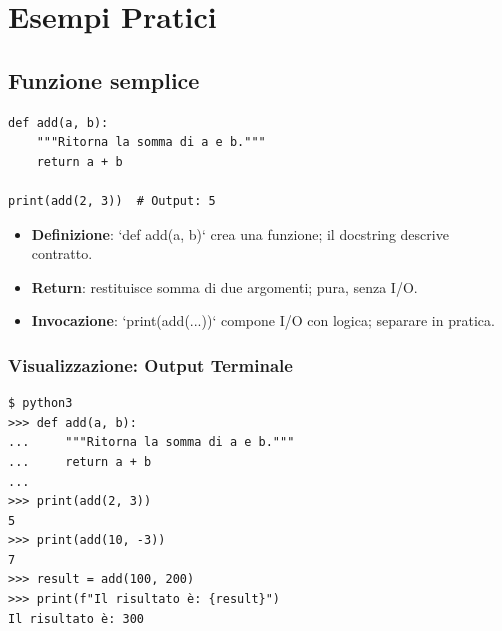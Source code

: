 \section{Esempi Pratici}
\label{sec:fun-esempi}
\subsection{Funzione semplice}
\label{subsec:fun-semplice}
\begin{lstlisting}
def add(a, b):
    """Ritorna la somma di a e b."""
    return a + b

print(add(2, 3))  # Output: 5
\end{lstlisting}
\begin{tcolorbox}[title=Spiegazione del codice]
\begin{itemize}
  \item \textbf{Definizione}: `def add(a, b)` crea una funzione; il docstring descrive contratto.
  \item \textbf{Return}: restituisce somma di due argomenti; pura, senza I/O.
  \item \textbf{Invocazione}: `print(add(...))` compone I/O con logica; separare in pratica.
\end{itemize}
\end{tcolorbox}

\subsubsection{Visualizzazione: Output Terminale}
\label{subsubsec:fun-semplice-terminal}
\begin{tcolorbox}[title=Esempio di Esecuzione nel Terminale, colback=black!5, colframe=blue!50!black]
\begin{lstlisting}[style=python]
$ python3
>>> def add(a, b):
...     """Ritorna la somma di a e b."""
...     return a + b
...
>>> print(add(2, 3))
5
>>> print(add(10, -3))
7
>>> result = add(100, 200)
>>> print(f"Il risultato è: {result}")
Il risultato è: 300
\end{lstlisting}
\end{tcolorbox}

